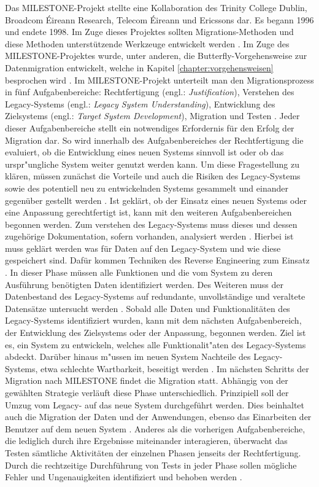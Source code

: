 Das MILESTONE-Projekt stellte eine Kollaboration des Trinity College Dublin, Broadcom Éireann Research, Telecom Éireann und Ericssons dar. Es begann 1996 und endete 1998. Im Zuge dieses Projektes sollten Migrations-Methoden und diese Methoden unterstützende Werkzeuge entwickelt werden \cite[S.~3]{wuLawless-1997}. Im Zuge des MILESTONE-Projektes wurde, unter anderen, die Butterfly-Vorgehensweise zur Datenmigration entwickelt, welche in Kapitel \ref{chapter:vorgehensweisen} besprochen wird \cite[S.~3]{wuLawless-1997}.
\lb
Im MILESTONE-Projekt unterteilt man den Migrationsprozess in fünf Aufgabenbereiche: Rechtfertigung (engl.: \textit{Justification}), Verstehen des Legacy-Systems (engl.: \textit{Legacy System Understanding}), Entwicklung des Zielsystems (engl.: \textit{Target System Development}), Migration und Testen \cite[S.~3]{wuLawless-1997}. Jeder dieser Aufgabenbereiche stellt ein notwendiges Erfordernis für den Erfolg der Migration dar. So wird innerhalb des Aufgabenbereiches der Rechtfertigung die evaluiert, ob die Entwicklung eines neuen Systems sinnvoll ist oder ob das urspr"ungliche System weiter genutzt werden kann. Um diese Fragestellung zu klären, müssen zunächst die Vorteile und auch die Risiken des Legacy-Systems sowie des potentiell neu zu entwickelnden Systems gesammelt und einander gegenüber gestellt werden \cite[S.~3]{wuLawless-1997}.
\lb
Ist geklärt, ob der Einsatz eines neuen Systems oder eine Anpassung gerechtfertigt ist, kann mit den weiteren Aufgabenbereichen begonnen werden. Zum verstehen des Legacy-Systems muss dieses und dessen zugehörige Dokumentation, sofern vorhanden, analysiert werden \cite[S.~3f.]{wuLawless-1997}. Hierbei ist muss geklärt werden was für Daten auf den Legacy-System und wie diese gespeichert sind. Dafür kommen Techniken des Reverse Engineering zum Einsatz \cite[S.~3f.]{wuLawless-1997}. In dieser Phase müssen alle Funktionen und die vom System zu deren Ausführung benötigten Daten identifiziert werden. Des Weiteren muss der Datenbestand des Legacy-Systems auf redundante, unvollständige und veraltete Datensätze untersucht werden \cite[S.~3f.]{wuLawless-1997}.
\lb
Sobald alle Daten und Funktionalitäten des Legacy-Systems identifiziert wurden, kann mit dem nächsten Aufgabenbereich, der Entwicklung des Zielsystems oder der Anpassung, begonnen werden. Ziel ist es, ein  System zu entwickeln, welches alle Funktionalit"aten des Legacy-Systems abdeckt. Darüber hinaus m"ussen im neuen System Nachteile des Legacy-Systems, etwa schlechte Wartbarkeit, beseitigt werden \cite[S.~3ff.]{wuLawless-1997}.
\lb
Im nächsten Schritts der Migration nach MILESTONE findet die Migration statt. Abhängig von der gewählten Strategie verläuft diese Phase unterschiedlich. Prinzipiell soll der Umzug vom Legacy- auf das neue System durchgeführt werden. Dies beinhaltet auch die Migration der Daten und der Anwendungen, ebenso das Einarbeiten der Benutzer auf dem neuen System \cite[S.~3ff.]{wuLawless-1997}.
\lb
Anderes als die vorherigen Aufgabenbereiche, die lediglich durch ihre Ergebnisse miteinander interagieren, überwacht das Testen sämtliche Aktivitäten der einzelnen Phasen jenseits der Rechtfertigung. Durch die rechtzeitige Durchführung von Tests in jeder Phase sollen mögliche Fehler und Ungenauigkeiten identifiziert und behoben werden \cite[S. 3f.]{wuLawless-1997}.

